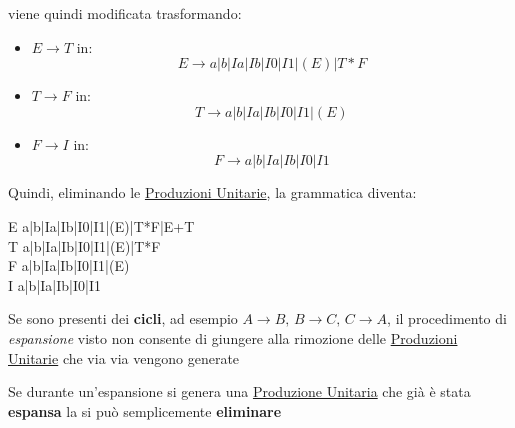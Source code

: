 viene quindi modificata trasformando:
\begin{itemize}
    \item $E\to T$ in:
        \[
            E \to a|b|Ia|Ib|I0|I1|(E)|T*F
        \]
    \item $T\to F$ in:
        \[
            T \to a|b|Ia|Ib|I0|I1|(E)
        \]
    \item $F\to I$ in:
        \[
            F \to a|b|Ia|Ib|I0|I1
        \]
\end{itemize}
Quindi, eliminando le \hyperref[def:prod-unit]{Produzioni Unitarie}, la grammatica diventa:
\begin{ceq}
    E \to a|b|Ia|Ib|I0|I1|(E)|T*F|E+T \\
    T \to a|b|Ia|Ib|I0|I1|(E)|T*F \\
    F \to a|b|Ia|Ib|I0|I1|(E) \\
    I \to a|b|Ia|Ib|I0|I1 \\
\end{ceq}
\begin{critical}
    Se sono presenti dei \textbf{cicli}, ad esempio $A\to B,\,B\to C,\,C\to A$, il procedimento di \textit{espansione} visto non consente di giungere alla rimozione delle \hyperref[def:prod-unit]{Produzioni Unitarie} che via via vengono generate
    \begin{tip}[Soluzione]
        Se durante un'espansione si genera una \hyperref[def:prod-unit]{Produzione Unitaria} che già è stata \textbf{espansa} la si può semplicemente \textbf{eliminare}
    \end{tip}
\end{critical}
